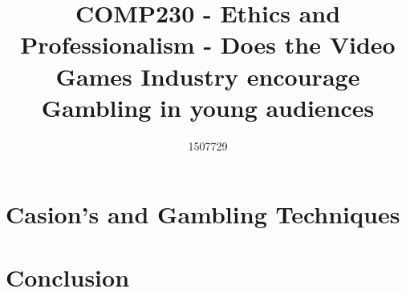 \documentclass{scrartcl}
\title{COMP230 - Ethics and Professionalism - Does the Video Games Industry encourage Gambling in young audiences}
\author{1507729}
\begin{document}
\maketitle

\section{Casion's and Gambling Techniques}
 


\section{Conclusion}





\end{document}
